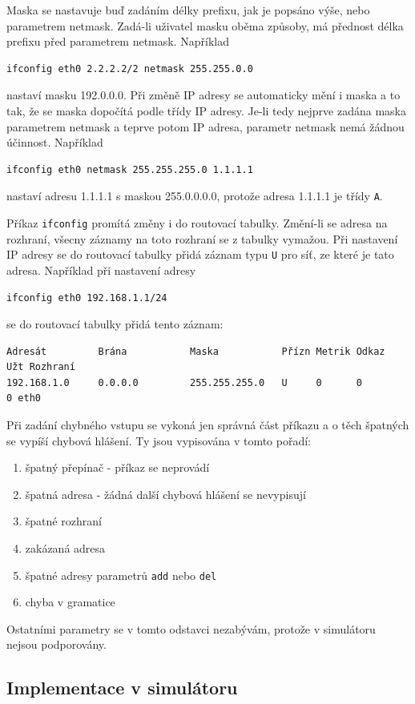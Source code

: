 Maska se nastavuje buď zadáním délky prefixu, jak je popsáno výše, nebo parametrem netmask. Zadá-li uživatel masku oběma způsoby, má přednost délka prefixu před parametrem netmask. Například
\begin{verbatim}ifconfig eth0 2.2.2.2/2 netmask 255.255.0.0\end{verbatim}
nastaví masku 192.0.0.0. Při změně IP adresy se automaticky mění i maska a to tak, že se maska dopočítá podle třídy IP adresy. Je-li tedy nejprve zadána maska parametrem netmask a teprve potom IP adresa, parametr netmask nemá žádnou účinnost. Například
\begin{verbatim}ifconfig eth0 netmask 255.255.255.0 1.1.1.1\end{verbatim}
nastaví adresu 1.1.1.1 s maskou 255.0.0.0.0, protože adresa 1.1.1.1 je třídy \verb|A|.

Příkaz \verb|ifconfig| promítá změny i do routovací tabulky. Změní-li se adresa na rozhraní, všecny záznamy na toto rozhraní se z tabulky vymažou. Při nastavení IP adresy se do routovací tabulky přidá záznam typu \verb|U| pro síť, ze které je tato adresa. Například při nastavení adresy
\begin{verbatim}ifconfig eth0 192.168.1.1/24\end{verbatim}
se do routovací tabulky přidá tento záznam:
\begin{verbatim}
Adresát         Brána           Maska           Přízn Metrik Odkaz  Užt Rozhraní
192.168.1.0     0.0.0.0         255.255.255.0   U     0      0        0 eth0
\end{verbatim}

Při zadání chybného vstupu se vykoná jen správná část příkazu a o těch špatných se vypíší chybová hlášení. Ty jsou vypisována v tomto pořadí:
\begin{enumerate}
\item špatný přepínač - příkaz se neprovádí
\item špatná adresa - žádná další chybová hlášení se nevypisují
\item špatné rozhraní
\item zakázaná adresa
\item špatné adresy parametrů \verb|add| nebo \verb|del|
\item chyba v gramatice
\end{enumerate}

Ostatními parametry se v tomto odstavci nezabývám, protože v simulátoru nejsou podporovány.


\subsection{Implementace v simulátoru}

